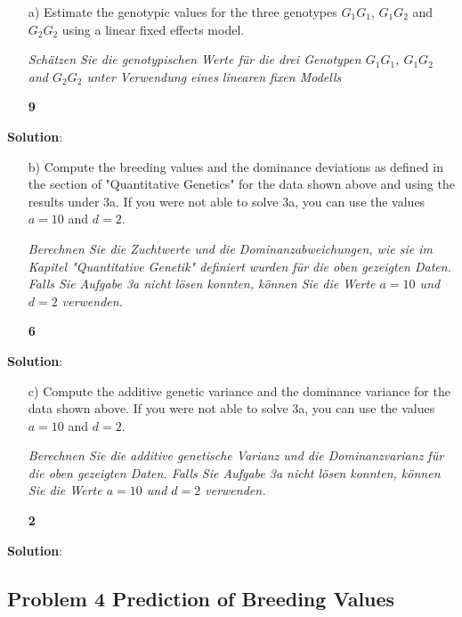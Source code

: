 \documentclass[
]{article}
\newcommand{\points}[1]
{\begin{flushright}\textbf{#1}\end{flushright}}
\newcommand{\solstart}
{\vspace{3ex}\textbf{Solution}:}
\begin{document}
\clearpage
\pagebreak

\vspace{3ex}
\begin{enumerate}
\item[a)] Estimate the genotypic values for the three genotypes $G_1G_1$, $G_1G_2$ and $G_2G_2$ using a linear fixed effects model. 

\textit{Schätzen Sie die genotypischen Werte für die drei Genotypen $G_1G_1$, $G_1G_2$ and $G_2G_2$ unter Verwendung eines linearen fixen Modells}
\points{9}
\end{enumerate}

\solstart

\clearpage
\pagebreak

\begin{enumerate}
\item[b)] Compute the breeding values and the dominance deviations as defined in the section of "Quantitative Genetics" for the data shown above and using the results under 3a. If you were not able to solve 3a, you can use the values $a = 10$ and $d = 2$. 

\textit{ Berechnen Sie die Zuchtwerte und die Dominanzabweichungen, wie sie im Kapitel "Quantitative Genetik" definiert wurden für die oben gezeigten Daten. Falls Sie Aufgabe 3a nicht lösen konnten, können Sie die Werte $a=10$ und $d = 2$ verwenden.}
\points{6}
\end{enumerate}

\solstart

\clearpage
\pagebreak

\vspace{3ex}
\begin{enumerate}
\item[c)] Compute the additive genetic variance and the dominance variance for the data shown above. If you were not able to solve 3a, you can use the values $a = 10$ and $d = 2$. 

\textit{Berechnen Sie die additive genetische Varianz und die Dominanzvarianz für die oben gezeigten Daten. Falls Sie Aufgabe 3a nicht lösen konnten, können Sie die Werte $a=10$ und $d = 2$ verwenden.}
\points{2}
\end{enumerate}

\solstart

\clearpage
\pagebreak

\hypertarget{problem-4-prediction-of-breeding-values}{%
\subsection{Problem 4 Prediction of Breeding
Values}\label{problem-4-prediction-of-breeding-values}}
\end{document}
